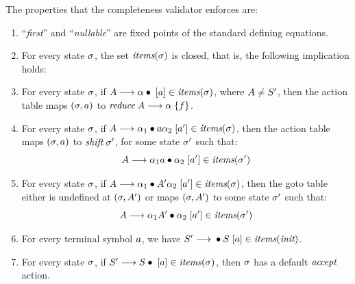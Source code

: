 \documentclass{llncs}
\begin{document}
The properties that the completeness validator enforces are:
%
\begin{enumerate}
\item ``\textit{first}'' and ``\textit{nullable}'' are fixed points of the standard
      defining equations.
\item For every state $\state$, the set $\items\state$ is closed, that is, the
      following implication holds:
      \begin{mathpar}
      \end{mathpar}
\item For every state $\state$, if $\lritem\nonterm\phrase{}\term \in
      \items\state$, where $\nonterm \neq S'$, then
      the action table maps $(\state, \term)$ to
      $\Areduce{\production\nonterm\phrase\sa}$.
\item For every state $\state$, if
      $\lritem\nonterm{\phrase_1}{\term\phrase_2}{\term'} \in \items\state$, then
      the action table maps $(\state, \term)$ to $\Ashift{\state'}$, for some
      state $\state'$ such that:
      \[\lritem\nonterm{\phrase_1\term}{\phrase_2}{\term'}\in \items{\state'}\]
\item For every state $\state$, if
      $\lritem\nonterm{\phrase_1}{\nonterm'\phrase_2}{\term'} \in \items\state$,
      then the goto table
      either is undefined at $(\state, \nonterm')$
      or maps $(\state, \nonterm')$ to some state $\state'$ such that:
      \[\lritem\nonterm{\phrase_1\nonterm'}{\phrase_2}{\term'}\in \items{\state'}\]
\item For every terminal symbol $\term$, we have $\lritem{S'}{}S\term \in \items\Init$.
\item For every state $\state$, if $\lritem{S'}S{}\term \in \items\state$, then
      $\state$ has a default $\Aaccept$ action.
\end{enumerate}
\end{document}
